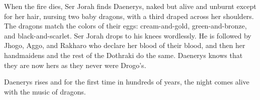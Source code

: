 When the fire dies, Ser Jorah finds Daenerys, naked but alive and unburnt except for her hair, nursing two baby dragons, with a third draped across her shoulders. The dragons match the colors of their eggs: cream-and-gold, green-and-bronze, and black-and-scarlet. Ser Jorah drops to his knees wordlessly. He is followed by Jhogo, Aggo, and Rakharo who declare her blood of their blood, and then her handmaidens and the rest of the Dothraki do the same. Daenerys knows that they are now hers as they never were Drogo’s.

Daenerys rises and for the first time in hundreds of years, the night comes alive with the music of dragons.